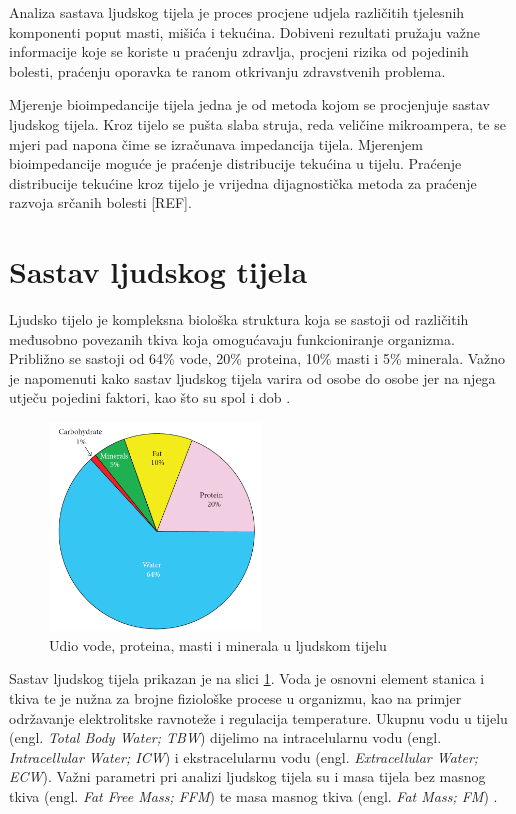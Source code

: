 \documentclass[../diplomski_rad.tex]{subfiles}
\begin{document}
\sloppy

\justifying

Analiza sastava ljudskog tijela je proces procjene udjela različitih tjelesnih komponenti 
poput masti, mišića i tekućina.
Dobiveni rezultati pružaju važne informacije koje se koriste u praćenju zdravlja, 
procjeni rizika od pojedinih bolesti, praćenju oporavka te ranom otkrivanju zdravstvenih problema.

Mjerenje bioimpedancije tijela jedna je od metoda kojom se procjenjuje sastav ljudskog tijela. 
Kroz tijelo se pušta slaba struja, reda veličine mikroampera, te se mjeri pad napona čime se izračunava impedancija tijela. 
Mjerenjem bioimpedancije moguće je praćenje distribucije tekućina u tijelu. 
Praćenje distribucije tekućine kroz tijelo je vrijedna dijagnostička metoda 
za praćenje razvoja srčanih bolesti [REF].

\section{Sastav ljudskog tijela}

Ljudsko tijelo je kompleksna biološka struktura koja se sastoji od različitih međusobno povezanih tkiva koja 
omogućavaju funkcioniranje organizma. Približno se sastoji od 
64\% vode,
20\% proteina,
10\% masti 
i 5\% minerala.
Važno je napomenuti kako sastav ljudskog tijela varira od osobe do osobe jer na njega utječu 
pojedini faktori, kao što su spol i dob \cite{Bera2014}.  

\begin{figure}[htb]
    \centering
    \includegraphics[width=0.5\textwidth]{Figures/sastav_tijela_2.png} 
    \caption{Udio vode, proteina, masti i minerala u ljudskom tijelu \cite{Bera2014}}
    \label{slk:sastav_tijela}
\end{figure}

Sastav ljudskog tijela prikazan je na slici \ref{slk:sastav_tijela}.
Voda je osnovni element stanica i tkiva te je nužna za brojne fiziološke procese u organizmu, 
kao na primjer održavanje elektrolitske ravnoteže i regulacija temperature.
Ukupnu vodu u tijelu (engl. \textit{Total Body Water; TBW}) 
dijelimo na intracelularnu vodu (engl. \textit{Intracellular Water; ICW}) i ekstracelularnu vodu (engl. \textit{Extracellular Water; ECW}). 
Važni parametri pri analizi ljudskog tijela su i masa tijela bez masnog tkiva (engl. \textit{Fat Free Mass; FFM}) 
te masa masnog tkiva (engl. \textit{Fat Mass; FM}) \cite{Bera2014}.
\end{document}
